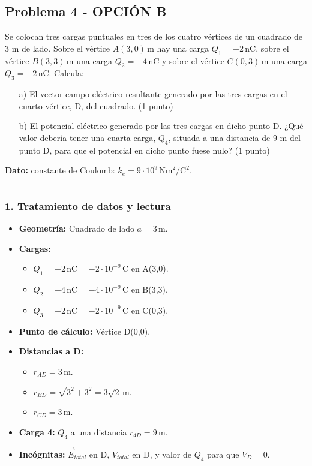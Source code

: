 \subsection{Problema 4 - OPCIÓN B}
\label{subsec:4B_2016_jul_ext}
\begin{cajaenunciado}
Se colocan tres cargas puntuales en tres de los cuatro vértices de un cuadrado de 3 m de lado. Sobre el vértice $A(3,0)\,\text{m}$ hay una carga $Q_1=-2\,\text{nC}$, sobre el vértice $B(3,3)\,\text{m}$ una carga $Q_2=-4\,\text{nC}$ y sobre el vértice $C(0,3)\,\text{m}$ una carga $Q_3=-2\,\text{nC}$. Calcula:
\begin{enumerate}
    \item[a)] El vector campo eléctrico resultante generado por las tres cargas en el cuarto vértice, D, del cuadrado. (1 punto)
    \item[b)] El potencial eléctrico generado por las tres cargas en dicho punto D. ¿Qué valor debería tener una cuarta carga, $Q_4$, situada a una distancia de 9 m del punto D, para que el potencial en dicho punto fuese nulo? (1 punto)
\end{enumerate}
\textbf{Dato:} constante de Coulomb: $k_e=9\cdot10^9\,\text{Nm}^2/\text{C}^2$.
\end{cajaenunciado}
\hrule

\subsubsection*{1. Tratamiento de datos y lectura}
\begin{itemize}
    \item \textbf{Geometría:} Cuadrado de lado $a=3\,\text{m}$.
    \item \textbf{Cargas:}
        \begin{itemize}
            \item $Q_1 = -2\,\text{nC} = -2\cdot10^{-9}\,\text{C}$ en A(3,0).
            \item $Q_2 = -4\,\text{nC} = -4\cdot10^{-9}\,\text{C}$ en B(3,3).
            \item $Q_3 = -2\,\text{nC} = -2\cdot10^{-9}\,\text{C}$ en C(0,3).
        \end{itemize}
    \item \textbf{Punto de cálculo:} Vértice D(0,0).
    \item \textbf{Distancias a D:}
        \begin{itemize}
            \item $r_{AD} = 3\,\text{m}$.
            \item $r_{BD} = \sqrt{3^2+3^2} = 3\sqrt{2}\,\text{m}$.
            \item $r_{CD} = 3\,\text{m}$.
        \end{itemize}
    \item \textbf{Carga 4:} $Q_4$ a una distancia $r_{4D}=9\,\text{m}$.
    \item \textbf{Incógnitas:} $\vec{E}_{total}$ en D, $V_{total}$ en D, y valor de $Q_4$ para que $V_D=0$.
\end{itemize}

